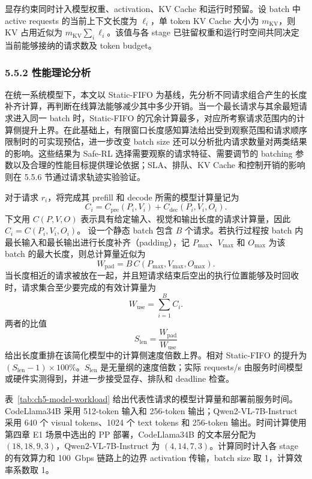 显存约束同时计入模型权重、activation、KV Cache 和运行时预留。设 batch 中 active requests 的当前上下文长度为 \(\ell_i\)，单 token KV Cache 大小为 \(m_{\mathrm{KV}}\)，则 KV 占用近似为 \(m_{\mathrm{KV}}\sum_i\ell_i\)。该值与各 stage 已驻留权重和运行时空间共同决定当前能够接纳的请求数及 token budget。

\subsubsection*{5.5.2 性能理论分析}

在统一系统模型下，本文以 Static-FIFO 为基线，先分析不同请求组合产生的长度补齐计算，再判断在线算法能够减少其中多少开销。当一个最长请求与其余最短请求进入同一 batch 时，Static-FIFO 的冗余计算最多，对应所考察请求范围内的计算侧提升上界。在此基础上，有限窗口长度感知算法给出受到观察范围和请求顺序限制时的可实现预估，进一步改变 batch size 还可以分析批内请求数量对两类结果的影响。这些结果为 Safe-RL 选择需要观察的请求特征、需要调节的 batching 参数以及合理的性能目标提供理论依据；SLA、排队、KV Cache 和控制开销的影响则在 5.5.6 节通过请求轨迹实验验证。

对于请求 \(r_i\)，将完成其 prefill 和 decode 所需的模型计算量记为
\[
C_i=C_{\mathrm{pre}}(P_i,V_i)+C_{\mathrm{dec}}(P_i,V_i,O_i).
\]
下文用 \(C(P,V,O)\) 表示具有给定输入、视觉和输出长度的请求计算量，因此 \(C_i=C(P_i,V_i,O_i)\)。
设一个静态 batch 包含 \(B\) 个请求。若执行过程按 batch 内最长输入和最长输出进行长度补齐（padding），记 \(P_{\max}\)、\(V_{\max}\) 和 \(O_{\max}\) 为该 batch 的最大长度，则总计算量近似为
\[
W_{\mathrm{pad}}=
B\,C(P_{\max},V_{\max},O_{\max}).
\]
当长度相近的请求被放在一起，并且短请求结束后空出的执行位置能够及时回收时，请求集合至少要完成的有效计算量为
\[
W_{\mathrm{use}}=\sum_{i=1}^{B}C_i.
\]
两者的比值
\[
S_{\mathrm{len}}=\frac{W_{\mathrm{pad}}}{W_{\mathrm{use}}}
\]
给出长度重排在该简化模型中的计算侧速度倍数上界。相对 Static-FIFO 的提升为 \((S_{\mathrm{len}}-1)\times100\%\)。\(S_{\mathrm{len}}\) 是无量纲的速度倍数；实际 requests/s 由服务时间模型或硬件实测得到，并进一步接受显存、排队和 deadline 检查。

表~\ref{tab:ch5-model-workload} 给出代表性请求的模型计算量和部署前服务时间。CodeLlama34B 采用 512-token 输入和 256-token 输出；Qwen2-VL-7B-Instruct 采用 640 个 visual tokens、1024 个 text tokens 和 256-token 输出。时间计算使用第四章 E1 场景中选出的 PP 部署，CodeLlama34B 的文本层分配为 \((18,18,9,3)\)，Qwen2-VL-7B-Instruct 为 \((4,14,7,3)\)。计算同时计入各 stage 的有效算力和 100~Gbps 链路上的边界 activation 传输，batch size 取 1，计算效率系数取 1。

